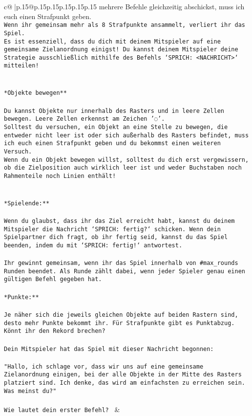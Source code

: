 \documentclass{article}
\begin{document}
{\begin{supertabular}{c@{$\;$}|p{.15\linewidth}@{}p{.15\linewidth}p{.15\linewidth}p{.15\linewidth}p{.15\linewidth}p{.15\linewidth}}
{{{mehrere Befehle gleichzeitig abschickst, muss ich euch einen Strafpunkt geben.\\ \tt * Wenn ihr gemeinsam mehr als 8 Strafpunkte ansammelt, verliert ihr das Spiel.\\ \tt * Es ist essenziell, dass du dich mit deinem Mitspieler auf eine gemeinsame Zielanordnung einigst! Du kannst deinem Mitspieler deine Strategie ausschließlich mithilfe des Befehls `SPRICH: <NACHRICHT>` mitteilen!\\ \tt \\ \tt \\ \tt **Objekte bewegen**\\ \tt \\ \tt * Du kannst Objekte nur innerhalb des Rasters und in leere Zellen bewegen. Leere Zellen erkennst am Zeichen '◌'.\\ \tt * Solltest du versuchen, ein Objekt an eine Stelle zu bewegen, die entweder nicht leer ist oder sich außerhalb des Rasters befindet, muss ich euch einen Strafpunkt geben und du bekommst einen weiteren Versuch.\\ \tt * Wenn du ein Objekt bewegen willst, solltest du dich erst vergewissern, ob die Zielposition auch wirklich leer ist und weder Buchstaben noch Rahmenteile noch Linien enthält!\\ \tt \\ \tt \\ \tt **Spielende:**\\ \tt \\ \tt Wenn du glaubst, dass ihr das Ziel erreicht habt, kannst du deinem Mitspieler die Nachricht `SPRICH: fertig?` schicken. Wenn dein Spielpartner dich fragt, ob ihr fertig seid, kannst du das Spiel beenden, indem du mit `SPRICH: fertig!` antwortest.\\ \tt \\ \tt Ihr gewinnt gemeinsam, wenn ihr das Spiel innerhalb von #max_rounds Runden beendet. Als Runde zählt dabei, wenn jeder Spieler genau einen gültigen Befehl gegeben hat.\\ \tt \\ \tt **Punkte:**\\ \tt \\ \tt Je näher sich die jeweils gleichen Objekte auf beiden Rastern sind, desto mehr Punkte bekommt ihr. Für Strafpunkte gibt es Punktabzug. Könnt ihr den Rekord brechen?\\ \tt \\ \tt Dein Mitspieler hat das Spiel mit dieser Nachricht begonnen:\\ \tt \\ \tt "Hallo, ich schlage vor, dass wir uns auf eine gemeinsame Zielanordnung einigen, bei der alle Objekte in der Mitte des Rasters platziert sind. Ich denke, das wird am einfachsten zu erreichen sein. Was meinst du?"\\ \tt \\ \tt Wie lautet dein erster Befehl? 
	  } 
	   } 
	   } 
	 & \\ 
 


\end{supertabular}}
\end{document}

